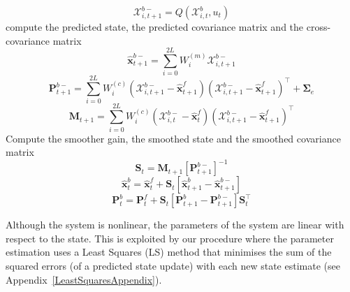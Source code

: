 \documentclass[12pt]{iopart}
\begin{document}
\begin{algorithm}
\begin{small}
\begin{algorithmic}[1]
		\begin{equation*}
			\mathcal X_{i,t+1}^{b-}=Q(\mathcal X_{i,t}^b,u_t) 
		\end{equation*}
		 compute the predicted state, the predicted covariance matrix and the cross-covariance matrix
		\begin{equation*}
			\hat{\mathbf x}_{t+1}^{b-}=\sum_{i=0}^{2L} W_i^{(m)}\mathcal X_{i,t+1}^{b-} 
		\end{equation*}
		\begin{equation*}
			\mathbf P_{t +1}^{b-}=\sum_{i=0}^{2L} W_i^{(c)}(\mathcal X_{i,t+1}^{b-}-\hat{\mathbf x}_{t +1}^{f})(\mathcal X_{i,t+1}^{b-}-\hat{\mathbf x}_{t +1}^{f})^\top+\boldsymbol \Sigma_e 
		\end{equation*}
		\begin{equation*}
			\mathbf M_{t +1}=\sum_{i=0}^{2L} W_i^{(c)}(\mathcal X_{i,t}^{b-}-\hat{\mathbf x}_{t}^{f})(\mathcal X_{i,t+1}^{b-}-\hat{\mathbf x}_{t+1}^{f})^\top 
		\end{equation*}
		 Compute the smoother gain, the smoothed state and the smoothed covariance matrix
		\begin{equation*}
			\mathbf S_t=\mathbf M_{t +1}\left[ \mathbf P_{t +1}^{b-}\right] ^{-1} 
		\end{equation*}
		\begin{equation*}
			\hat{\mathbf x}_t^b=\hat{\mathbf x}_t^f+\mathbf S_t\left[\hat{\mathbf x}_{t+1}^{b}-\hat{\mathbf x}_{t+1}^{b-}\right] 
		\end{equation*}
		\begin{equation*}
			\mathbf P_{t}^{b}=\mathbf P_{t}^{f}+\mathbf S_t\left[\mathbf P_{t+1}^{b}-\mathbf P_{t+1}^{b-} \right]\mathbf S_t^\top 
		\end{equation*}
	\end{algorithmic}
\end{small}
\end{algorithm}

Although the system is nonlinear, the parameters of the system are linear with respect to the state. This is exploited by our procedure where the parameter estimation uses a Least Squares (LS) method that minimises the sum of the squared errors (of a predicted state update) with each new state estimate (see Appendix~\ref{LeastSquaresAppendix}).
\end{document}
